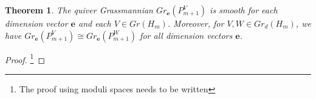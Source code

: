 \documentclass{amsart}
\newtheorem{theorem}{Theorem}[section]
\newcommand{\bfe}{\mathbf{e}}
\newcommand\udim{{\underline{\dim}\, }}
\newcommand{\CC}{\mathbb{C}}
\begin{document}
\begin{theorem}
  The quiver Grassmannian $Gr_\bfe(P_{m+1}^V)$ is smooth for each dimension vector $\bfe$ and each $V\in Gr(H_m)$.
  Moreover, for $V,W\in Gr_d(H_m)$, we have $Gr_\bfe(P_{m+1}^V)\cong Gr_\bfe(P_{m+1}^W)$ for all dimension vectors $\bfe$.
\end{theorem}
\begin{proof}
  \footnote{The proof using moduli spaces needs to be written}

\end{proof}
\end{document}
